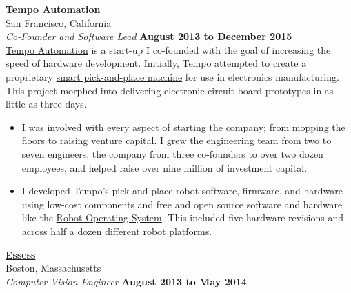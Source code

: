 \documentclass[10pt]{article}
\newenvironment{outerlist}[1][\enskip\textbullet]%
        {\begin{itemize}[#1]}{\end{itemize}%
         \vspace{-.6\baselineskip}}
\newcommand{\blankline}{\quad\pagebreak[2]}
\begin{document}
\blankline
\newline
\href{http://www.tempoautomation.com/}{\textbf{Tempo Automation}} \\
San Francisco, California \\
\textit{Co-Founder and Software Lead}%
        \hfill \textbf{August 2013 to December 2015}  \\

\blankline
\newline
\href{http://www.tempoautomation.com/}{Tempo Automation} is a start-up I co-founded with the goal of increasing the speed of hardware development. Initially, Tempo attempted to create a proprietary \href{http://radar.oreilly.com/2014/10/intoxicating-machines.html}{smart pick-and-place machine} for use in electronics manufacturing. This project morphed into delivering electronic circuit board prototypes in as little as three days.  
\\
\begin{outerlist}
\item I was involved with every aspect of starting the company; from mopping the floors to raising venture capital. I grew the engineering team from two to seven engineers, the company from three co-founders to over two dozen employees, and helped raise over nine million of investment capital.  
\item I developed Tempo's pick and place robot software, firmware, and hardware using low-cost components and free and open source software and hardware like the \href{http://www.ros.org/}{Robot Operating System}. This included five hardware revisions and across half a dozen different robot platforms. 
\end{outerlist}
\blankline
\newline
\href{http://www.essess.com/}{\textbf{Essess}} \\
Boston, Massachusetts \\
\textit{Computer Vision Engineer}%
        \hfill \textbf{August 2013 to May 2014}  \\
\end{document}

